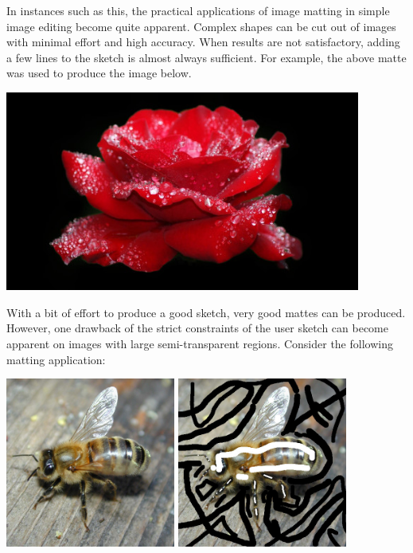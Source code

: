In instances such as this, the practical applications of image matting in simple image editing become quite apparent. Complex shapes can be cut out of images with minimal effort and high accuracy. When results are not satisfactory, adding a few lines to the sketch is almost always sufficient. For example, the above matte was used to produce the image below.
\\
\begin{center}
\includegraphics[width=4.6in]{fig/rose_blackbg.jpg}
\end{center}
With a bit of effort to produce a good sketch, very good mattes can be produced. However, one drawback of the strict constraints of the user sketch can become apparent on images with large semi-transparent regions. Consider the following matting application:
\\
\begin{center}
\includegraphics[width=2.2in]{fig/bee.jpg}
\hspace{.2in}
\includegraphics[width=2.2in]{fig/bee_sketch.jpg}
\end{center}
